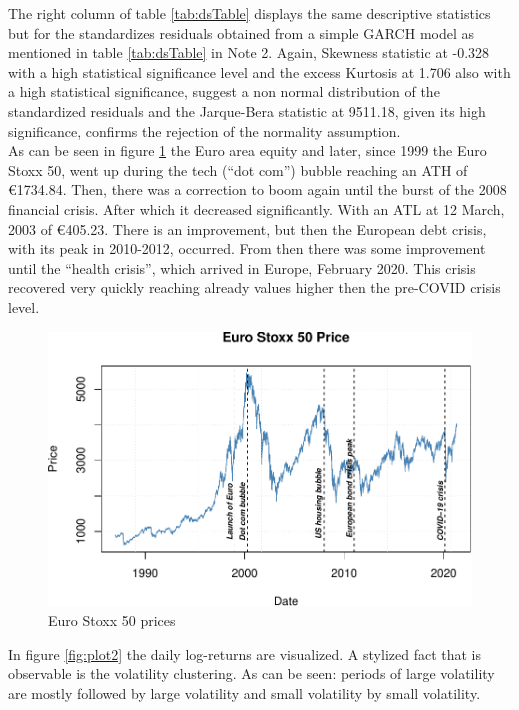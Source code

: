 \documentclass[a4paper, twoside]{templates/ociamthesis}
\begin{document}
\noindent The right column of table \ref{tab:dsTable} displays the same descriptive statistics but for the standardizes residuals obtained from a simple GARCH model as mentioned in table \ref{tab:dsTable} in Note 2. Again, Skewness statistic at -0.328 with a high statistical significance level and the excess Kurtosis at 1.706 also with a high statistical significance, suggest a non normal distribution of the standardized residuals and the Jarque-Bera statistic at 9511.18, given its high significance, confirms the rejection of the normality assumption.~\\

\noindent As can be seen in figure \ref{fig:plot1} the Euro area equity and later, since 1999 the Euro Stoxx 50, went up during the tech (``dot com'') bubble reaching an ATH of €1734.84. Then, there was a correction to boom again until the burst of the 2008 financial crisis. After which it decreased significantly. With an ATL at 12 March, 2003 of €405.23. There is an improvement, but then the European debt crisis, with its peak in 2010-2012, occurred. From then there was some improvement until the ``health crisis'', which arrived in Europe, February 2020. This crisis recovered very quickly reaching already values higher then the pre-COVID crisis level.

\begin{figure}[h]

{\centering \includegraphics[width=0.95\linewidth]{_main_files/figure-latex/plot1-1} 

}

\caption{Euro Stoxx 50 prices}\label{fig:plot1}
\end{figure}

\noindent In figure \ref{fig:plot2} the daily log-returns are visualized. A stylized fact that is observable is the volatility clustering. As can be seen: periods of large volatility are mostly followed by large volatility and small volatility by small volatility.
\end{document}
